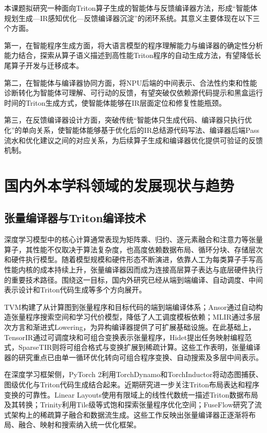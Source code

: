 本课题拟研究一种面向Triton算子生成的智能体与反馈编译器方法，形成“智能体规划生成—IR感知优化—反馈编译器沉淀”的闭环系统。其意义主要体现在以下三个方面。

第一，在智能程序生成方面，将大语言模型的程序理解能力与编译器的确定性分析能力结合，探索从算子语义描述到高性能Triton程序的自动生成方法，有望降低长尾算子开发与迁移成本。

第二，在智能体与编译器协同方面，将NPU后端的中间表示、合法性约束和性能诊断转化为智能体可理解、可行动的反馈，有望突破仅依赖源代码提示和黑盒运行时间的Triton生成方式，使智能体能够在IR层面定位和修复性能瓶颈。

第三，在反馈编译器设计方面，突破传统“智能体只生成代码、编译器只执行优化”的单向关系，使智能体能够基于优化后的IR总结源代码写法、编译器后端Pass流水和优化建议之间的对应关系，为后续算子生成和编译器优化提供可验证的反馈机制。

\chapter{国内外本学科领域的发展现状与趋势}

\section{张量编译器与Triton编译技术}

深度学习模型中的核心计算通常表现为矩阵乘、归约、逐元素融合和注意力等张量算子，其性能不仅取决于算法复杂度，也高度依赖数据布局、循环分块、存储层次和硬件执行模型。随着模型规模和硬件形态不断演进，依靠人工为每类算子手写高性能内核的成本持续上升，张量编译器因而成为连接高层算子表达与底层硬件执行的重要技术路径。围绕这一目标，国内外研究已经从端到端编译、自动调度、中间表示设计和Triton代码生成等多个方向展开。

TVM构建了从计算图到张量程序和目标代码的端到端编译体系\citep{chen2018tvm}；Ansor通过自动构造张量程序搜索空间和学习代价模型，降低了人工调度模板依赖\citep{zheng2020ansor}；MLIR通过多层次方言和渐进式Lowering，为异构编译器提供了可扩展基础设施\citep{lattner2021mlir}。在此基础上，TensorIR通过可调度块和可组合变换表示张量程序\citep{feng2023tensorir}，Hidet提出任务映射编程范式\citep{ding2023hidet}，SparseTIR则将可组合格式与变换扩展到稀疏计算\citep{ye2023sparsetir}。这些工作表明，张量编译器的研究重点已由单一循环优化转向可组合程序变换、自动搜索及多层中间表示。

在深度学习框架侧，PyTorch 2利用TorchDynamo和TorchInductor将动态图捕获、图级优化与Triton代码生成结合起来\citep{ansel2024pytorch2}。近期研究进一步关注Triton布局表达和程序变换的可靠性。Linear Layouts使用有限域上的线性代数统一描述Triton数据布局及其转换\citep{zhou2026linear}；Trinity利用Tile级等式饱和探索张量程序优化空间\citep{park2026trinity}；FuseFlow研究了流式架构上的稀疏算子融合和数据流生成\citep{lacouture2026fuseflow}。这些工作反映出张量编译器正逐渐将布局、融合、映射和搜索纳入统一优化框架。

